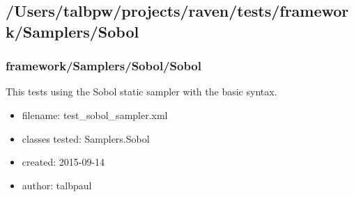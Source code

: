   \subsection{/Users/talbpw/projects/raven/tests/framework/Samplers/Sobol}
    \subsubsection{framework/Samplers/Sobol/Sobol}
      
      This tests using the Sobol static sampler with the basic syntax.
    
      \begin{itemize}
          \item filename: test\_sobol\_sampler.xml
          \item classes tested: Samplers.Sobol
          \item created: 2015-09-14
          \item author: talbpaul
      \end{itemize}
